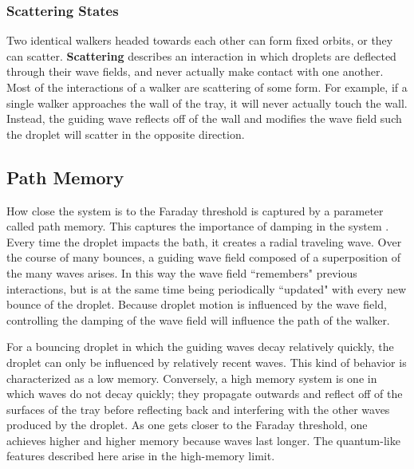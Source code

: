             \subsubsection{Scattering States}
            Two identical walkers headed towards each other can form fixed orbits, or they can scatter. \textbf{Scattering} describes an interaction in which droplets are deflected through their wave fields, and never actually make contact with one another. Most of the interactions of a walker are scattering of some form. For example, if a single walker approaches the wall of the tray, it will never actually touch the wall. Instead, the guiding wave reflects off of the wall and modifies the wave field such the droplet will scatter in the opposite direction.           



 
            \subsection{Path Memory}
                        
            How close the system is to the Faraday threshold is captured by a parameter called path memory. This captures the importance of damping in the system . Every time the droplet impacts the bath, it creates a radial traveling wave. Over the course of many bounces, a guiding wave field composed of a superposition of the many waves arises. In this way the wave field ``remembers" previous interactions, but is at the same time being periodically ``updated" with every new bounce of the droplet. Because droplet motion is influenced by the wave field, controlling the damping of the wave field will influence the path of the walker. 
            
For a bouncing droplet in which the guiding waves decay relatively quickly, the droplet can only be influenced by relatively recent waves. This kind of behavior is characterized as a low memory. Conversely, a high memory system is one in which waves do not decay quickly; they propagate outwards and reflect off of the surfaces of the tray before reflecting back and interfering with the other waves produced by the droplet. As one gets closer to the Faraday threshold, one achieves higher and higher memory because waves last longer. The quantum-like features described here arise in the high-memory limit. 

